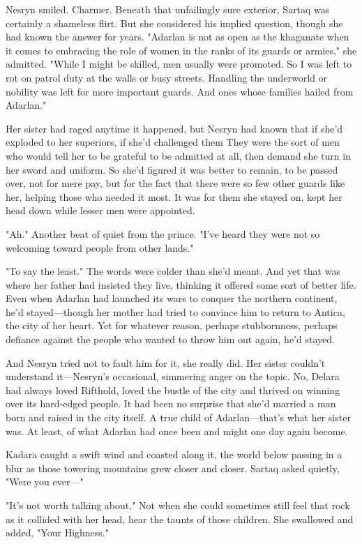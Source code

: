 Nesryn smiled. Charmer. Beneath that unfailingly sure exterior, Sartaq was certainly a shameless flirt. But she considered his implied question, though she had known the answer for years. "Adarlan is not as
 open as the khaganate when it comes to embracing the role of women in the ranks of its guards or armies," she admitted. "While I might be skilled, men usually were promoted. So I was left to rot on patrol duty at the walls or busy streets. Handling the underworld or nobility was left for more important guards. And ones whose families hailed from Adarlan."

Her sister had raged anytime it happened, but Nesryn had known that if she'd exploded to her superiors, if she'd challenged them  They were the sort of men who would tell her to be grateful to be admitted at all, then demand she turn in her sword and uniform. So she'd figured it was better to remain, to be passed over, not for mere pay, but for the fact that there were so few other guards like her, helping those who needed it most. It was for them she stayed on, kept her head down while lesser men were appointed.

"Ah." Another beat of quiet from the prince. "I've heard they were not so welcoming toward people from other lands."

"To say the least." The words were colder than she'd meant. And yet that was where her father had insisted they live, thinking it offered some sort of better life. Even when Adarlan had launched its wars to conquer the northern continent, he'd stayed---though her mother had tried to convince him to return to Antica, the city of her heart. Yet for whatever reason, perhaps stubbornness, perhaps defiance against the people who wanted to throw him out again, he'd stayed.

And Nesryn tried not to fault him for it, she really did. Her sister couldn't understand it---Nesryn's occasional, simmering anger on the topic. No, Delara had always loved Rifthold, loved the bustle of the city and thrived on winning over its hard-edged people. It had been no surprise that she'd married a man born and raised in the city itself. A true child of Adarlan---that's what her sister was. At least, of what Adarlan had once been and might one day again become.

Kadara caught a swift wind and coasted along it, the world below passing in a blur as those towering mountains grew closer and closer. Sartaq asked quietly, "Were you ever---"

"It's not worth talking about." Not when she could sometimes still feel that rock as it collided with her head, hear the taunts of those children. She swallowed and added, "Your Highness."


